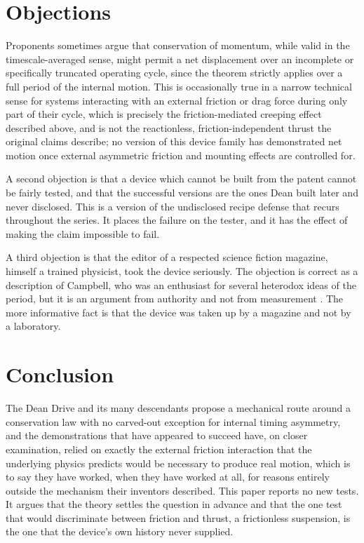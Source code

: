 \documentclass[11pt]{article}
\begin{document}
\section{Objections}

Proponents sometimes argue that conservation of momentum, while valid in the timescale-averaged sense, might permit a net displacement over an incomplete or specifically truncated operating cycle, since the theorem strictly applies over a full period of the internal motion. This is occasionally true in a narrow technical sense for systems interacting with an external friction or drag force during only part of their cycle, which is precisely the friction-mediated creeping effect described above, and is not the reactionless, friction-independent thrust the original claims describe; no version of this device family has demonstrated net motion once external asymmetric friction and mounting effects are controlled for.

A second objection is that a device which cannot be built from the patent cannot be fairly tested, and that the successful versions are the ones Dean built later and never disclosed. This is a version of the undisclosed recipe defense that recurs throughout the series. It places the failure on the tester, and it has the effect of making the claim impossible to fail.

A third objection is that the editor of a respected science fiction magazine, himself a trained physicist, took the device seriously. The objection is correct as a description of Campbell, who was an enthusiast for several heterodox ideas of the period, but it is an argument from authority and not from measurement \cite{C1960}. The more informative fact is that the device was taken up by a magazine and not by a laboratory.

\section{Conclusion}

The Dean Drive and its many descendants propose a mechanical route around a conservation law with no carved-out exception for internal timing asymmetry, and the demonstrations that have appeared to succeed have, on closer examination, relied on exactly the external friction interaction that the underlying physics predicts would be necessary to produce real motion, which is to say they have worked, when they have worked at all, for reasons entirely outside the mechanism their inventors described. This paper reports no new tests. It argues that the theory settles the question in advance and that the one test that would discriminate between friction and thrust, a frictionless suspension, is the one that the device's own history never supplied.
\end{document}
